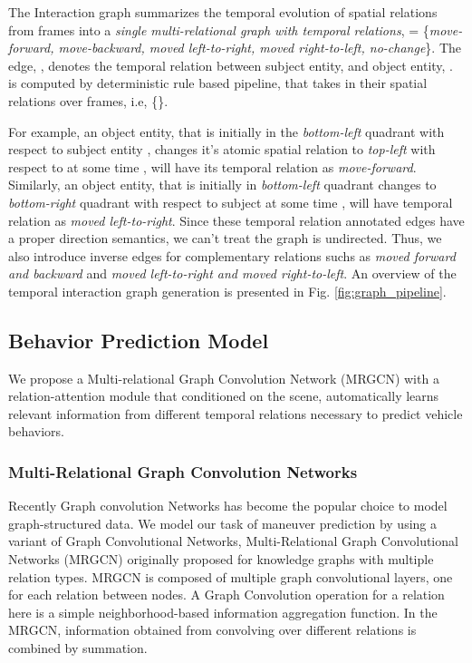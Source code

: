 \documentclass[letterpaper, 10 pt, conference]{ieeeconf}
\begin{document}
The Interaction graph summarizes the temporal evolution of spatial relations from  frames into a \textit{single multi-relational graph with temporal relations},  = \{\textit{move-forward, move-backward, moved left-to-right, moved right-to-left, no-change}\}. The edge, , denotes the temporal relation between subject entity,  and object entity, .  is computed by deterministic rule based pipeline, that takes in their spatial relations over  frames, i.e, \{\}.

For example, an object entity,  that is initially in the \textit{bottom-left} quadrant with respect to subject entity , changes it's atomic spatial relation to \textit{top-left} with respect to  at some time , will have its temporal relation  as \textit{move-forward}. Similarly, an object entity,  that is initially in \textit{bottom-left} quadrant changes to \textit{bottom-right} quadrant with respect to subject  at some time , will have temporal relation  as \textit{moved left-to-right}. Since these temporal relation annotated edges have a proper direction semantics, we can't treat the graph is undirected. Thus, we also introduce inverse edges for complementary relations suchs as \textit{moved forward and backward} and \textit{moved left-to-right and moved right-to-left}. An overview of the temporal interaction graph generation is presented in Fig. \ref{fig:graph_pipeline}. 

\subsection{Behavior Prediction Model}
We propose a Multi-relational Graph Convolution Network (MRGCN) with a relation-attention module that conditioned on the scene, automatically learns relevant information from different temporal relations necessary to predict vehicle behaviors. 

\subsubsection{Multi-Relational Graph Convolution Networks}
\label{sec:MRGCN}

Recently Graph convolution Networks \cite{kipf2016semi}
has become the popular choice to model graph-structured data. We model our task of maneuver prediction by using a variant of Graph Convolutional Networks, Multi-Relational Graph Convolutional Networks (MRGCN) \cite{schlichtkrull2018modeling} originally proposed for knowledge graphs with multiple relation types. MRGCN is composed of multiple graph convolutional layers, one for each relation between nodes. A Graph Convolution operation for a relation  here is a simple neighborhood-based information aggregation function. In the MRGCN, information obtained from convolving over different relations is combined by summation.
\end{document}
